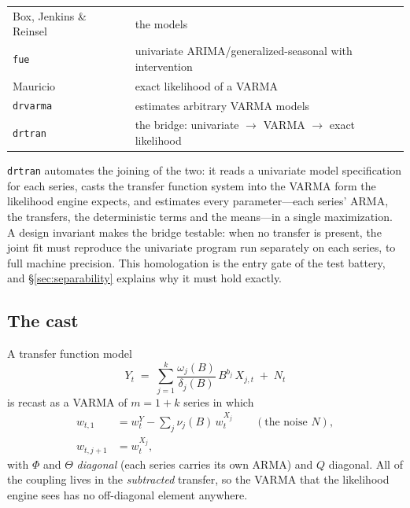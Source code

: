 \documentclass[11pt,a4paper]{article}
\theoremstyle{plain}
\theoremstyle{remark}
\begin{document}
\begin{center}
\begin{tabular}{ll}
\toprule
Box, Jenkins \& Reinsel~\cite{bjr1994} & the models \\
\quad \texttt{fue} & univariate ARIMA/generalized-seasonal with intervention \\
Mauricio~\cite{mauricio1995,mauricio1997} & exact likelihood of a VARMA \\
\quad \texttt{drvarma} & estimates arbitrary VARMA models \\
\quad\quad \texttt{drtran} & the bridge: univariate $\rightarrow$ VARMA $\rightarrow$ exact likelihood \\
\bottomrule
\end{tabular}
\end{center}

\noindent
\texttt{drtran} automates the joining of the two: it reads a univariate model
specification for each series, casts the transfer function system into the VARMA
form the likelihood engine expects, and estimates every parameter---each series'
ARMA, the transfers, the deterministic terms and the means---in a single
maximization. A design invariant makes the bridge testable: when no transfer is
present, the joint fit must reproduce the univariate program run separately on
each series, to full machine precision. This homologation is the entry gate of
the test battery, and \S\ref{sec:separability} explains why it must hold exactly.

\subsection{The cast}

A transfer function model
\begin{equation}
Y_t \;=\; \sum_{j=1}^{k} \frac{\omega_j(B)}{\delta_j(B)}\,B^{b_j}\,X_{j,t}
        \;+\; N_t
\label{eq:tf}
\end{equation}
is recast as a VARMA of $m = 1+k$ series in which
\begin{align}
w_{t,1} &= w^{Y}_t - \textstyle\sum_j \nu_j(B)\, w^{X_j}_t \qquad (\text{the noise } N),\\
w_{t,j+1} &= w^{X_j}_t,
\end{align}
with $\Phi$ and $\Theta$ \emph{diagonal} (each series carries its own ARMA) and
$Q$ diagonal. All of the coupling lives in the \emph{subtracted} transfer, so the
VARMA that the likelihood engine sees has no off-diagonal element anywhere.
\end{document}
